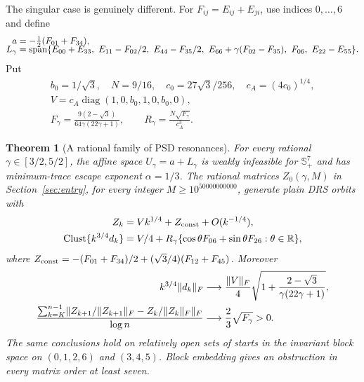 \documentclass[11pt]{article}
\newtheorem{theorem}{Theorem}[section]
\theoremstyle{remark}\newtheorem{remark}[theorem]{Remark}
\newcommand{\R}{\mathbb R}\newcommand{\Ssym}{\mathbb S}\newcommand{\K}{\mathcal K}
\newcommand{\Clust}{\operatorname{Clust}}\newcommand{\diag}{\operatorname{diag}}
\numberwithin{equation}{section}
\begin{document}
The singular case is genuinely different. For $F_{ij}=E_{ij}+E_{ji}$, use indices $0,\ldots,6$ and define
\begin{align}\label{eq:family}
 a&=-\tfrac12(F_{01}+F_{34}),\\[-2mm]
 L_\gamma&=\operatorname{span}\{E_{00}+E_{33},\ E_{11}-F_{02}/2,\ E_{44}-F_{35}/2,
 \ E_{66}+\gamma(F_{02}-F_{35}),\ F_{06},\ E_{22}-E_{55}\}.\notag
\end{align}
Put
\begin{equation}\label{eq:constants}
 \begin{gathered}
 b_0=1/\sqrt3,\quad N=9/16,\quad c_0=27\sqrt3/256,
 \quad c_A=(4c_0)^{1/4},\\
 V=c_A\diag(1,0,b_0,1,0,b_0,0),\\
 F_\gamma=\frac{9(2-\sqrt3)}{64\gamma(22\gamma+1)},\qquad
 R_\gamma=\frac{N\sqrt{F_\gamma}}{c_A^3}.
 \end{gathered}
\end{equation}

\begin{theorem}[A rational family of PSD resonances]\label{thm:resonance}
For every rational $\gamma\in[3/2,5/2]$, the affine space $U_\gamma=a+L_\gamma$ is weakly infeasible for $\Ssym_+^7$ and has minimum-trace escape exponent $\alpha=1/3$. The rational matrices $Z_0(\gamma,M)$ in Section~\ref{sec:entry}, for every integer $M\geq10^{50000000000}$, generate plain DRS orbits with
\begin{align}
 Z_k&=Vk^{1/4}+Z_{\rm const}+O(k^{-1/4}),\\
 \Clust\{k^{3/4}d_k\}
 &=V/4+R_\gamma\{\cos\theta F_{06}+\sin\theta F_{26}:\theta\in\R\},\label{eq:circle}
\end{align}
where $Z_{\rm const}=-(F_{01}+F_{34})/2+(\sqrt3/4)(F_{12}+F_{45})$. Moreover
\begin{align}
 k^{3/4}\lVert d_k\rVert_F&\longrightarrow
 \frac{\lVert V\rVert_F}{4}\sqrt{1+\frac{2-\sqrt3}{\gamma(22\gamma+1)}},\label{eq:resnorm}\\
 \frac{\sum_{k=K}^{n-1}\lVert Z_{k+1}/\lVert Z_{k+1}\rVert_F-Z_k/\lVert Z_k\rVert_F\rVert_F}{\log n}
 &\longrightarrow\frac23\sqrt{F_\gamma}>0.\label{eq:resangular}
\end{align}
The same conclusions hold on relatively open sets of starts in the invariant block space on $(0,1,2,6)$ and $(3,4,5)$. Block embedding gives an obstruction in every matrix order at least seven.
\end{theorem}
\end{document}
